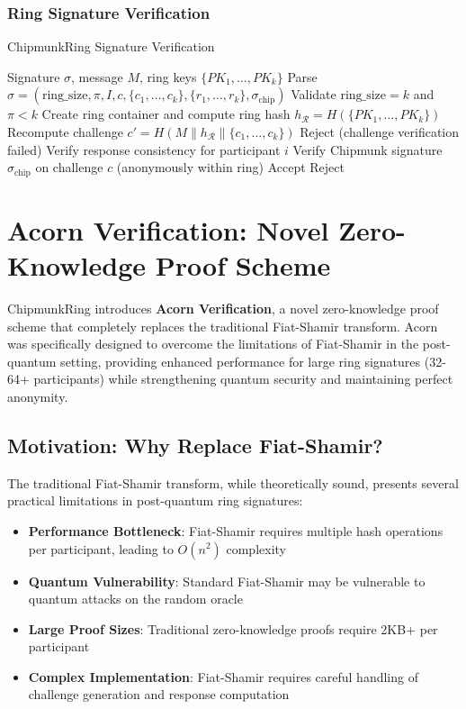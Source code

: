 \documentclass[11pt,a4paper]{article}
\begin{document}
\subsubsection{Ring Signature Verification}
\begin{algorithm}
\caption{ChipmunkRing Signature Verification}
\begin{algorithmic}[1]
\REQUIRE Signature $\sigma$, message $M$, ring keys $\{PK_1, \ldots, PK_k\}$
\STATE Parse $\sigma = (\text{ring\_size}, \pi, I, c, \{c_1, \ldots, c_k\}, \{r_1, \ldots, r_k\}, \sigma_{\text{chip}})$
\STATE Validate $\text{ring\_size} = k$ and $\pi < k$
\STATE Create ring container and compute ring hash $h_{\mathcal{R}} = H(\{PK_1, \ldots, PK_k\})$
\STATE Recompute challenge $c' = H(M \| h_{\mathcal{R}} \| \{c_1, \ldots, c_k\})$
    \RETURN Reject (challenge verification failed)
\ENDIF
{}
    \STATE Verify response consistency for participant $i$
\ENDFOR
\STATE Verify Chipmunk signature $\sigma_{\text{chip}}$ on challenge $c$ (anonymously within ring)
    \RETURN Accept
\ELSE
    \RETURN Reject
\ENDIF
\end{algorithmic}
\end{algorithm}

\section{Acorn Verification: Novel Zero-Knowledge Proof Scheme}

ChipmunkRing introduces \textbf{Acorn Verification}, a novel zero-knowledge proof scheme that completely replaces the traditional Fiat-Shamir transform. Acorn was specifically designed to overcome the limitations of Fiat-Shamir in the post-quantum setting, providing enhanced performance for large ring signatures (32-64+ participants) while strengthening quantum security and maintaining perfect anonymity.

\subsection{Motivation: Why Replace Fiat-Shamir?}

The traditional Fiat-Shamir transform, while theoretically sound, presents several practical limitations in post-quantum ring signatures:

\begin{itemize}
\item \textbf{Performance Bottleneck}: Fiat-Shamir requires multiple hash operations per participant, leading to $O(n^2)$ complexity
\item \textbf{Quantum Vulnerability}: Standard Fiat-Shamir may be vulnerable to quantum attacks on the random oracle
\item \textbf{Large Proof Sizes}: Traditional zero-knowledge proofs require 2KB+ per participant
\item \textbf{Complex Implementation}: Fiat-Shamir requires careful handling of challenge generation and response computation
\end{itemize}
\end{document}
